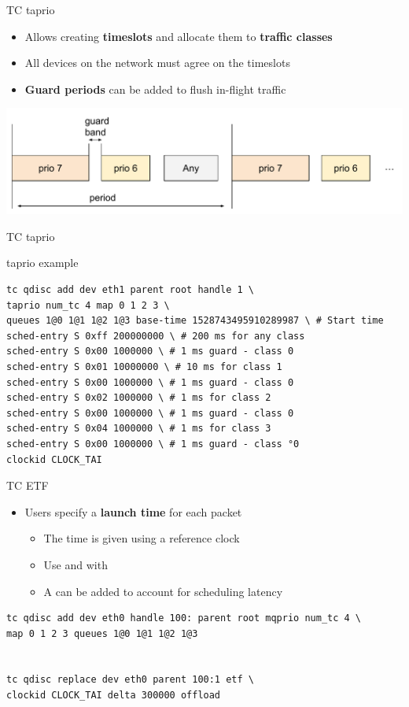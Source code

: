 \begin{frame}{TC taprio}
	\begin{itemize}
		\item Allows creating \textbf{timeslots} and allocate them to \textbf{traffic classes}
		\item All devices on the network must agree on the timeslots
		\item \textbf{Guard periods} can be added to flush in-flight traffic
	\end{itemize}
	\includegraphics[width=\textwidth]{slides/networking-tsn-taprio/taprio.pdf}
\end{frame}

\begin{frame}[fragile]{TC taprio}
	\begin{block}{taprio example}
		\begin{verbatim}
tc qdisc add dev eth1 parent root handle 1 \
taprio num_tc 4 map 0 1 2 3 \
queues 1@0 1@1 1@2 1@3 base-time 1528743495910289987 \ # Start time
sched-entry S 0xff 200000000 \ # 200 ms for any class
sched-entry S 0x00 1000000 \ # 1 ms guard - class 0
sched-entry S 0x01 10000000 \ # 10 ms for class 1
sched-entry S 0x00 1000000 \ # 1 ms guard - class 0
sched-entry S 0x02 1000000 \ # 1 ms for class 2
sched-entry S 0x00 1000000 \ # 1 ms guard - class 0
sched-entry S 0x04 1000000 \ # 1 ms for class 3
sched-entry S 0x00 1000000 \ # 1 ms guard - class °0
clockid CLOCK_TAI
		\end{verbatim}
	\end{block}
\end{frame}

\begin{frame}[fragile]{TC ETF}
	\begin{itemize}
		\item Users specify a \textbf{launch time} for each packet
			\begin{itemize}
				\item The time is given using a reference clock
				\item Use  and  with 
				\item A \code{delta} can be added to account for scheduling latency
			\end{itemize}
	\end{itemize}
	\begin{verbatim}
tc qdisc add dev eth0 handle 100: parent root mqprio num_tc 4 \
map 0 1 2 3 queues 1@0 1@1 1@2 1@3


tc qdisc replace dev eth0 parent 100:1 etf \
clockid CLOCK_TAI delta 300000 offload
	\end{verbatim}
\end{frame}

